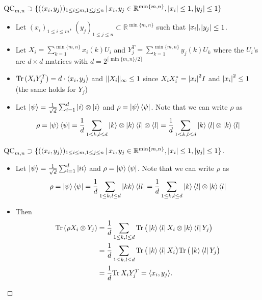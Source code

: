 \begin{frame}
	\begin{block}{$ \textup{QC}_{m,n} \supset \{ (\langle x_i,y_j \rangle)_{1 \le i \le m, 1 \le j \le n} \,| \, x_i,y_j \in \mathbb{R}^{ \min \{m,n \} }, \vert x_i  \vert \le 1, \vert y_j \vert \le 1  \} $}
		\begin{itemize}
			\item<1->  Let $ (x_i)_{1 \le i \le m}, \, (y_j)_{1 \le j \le n} \subset \mathbb{R}^{\min \{ m,n \}}$ such that $ {\left|{x_i}\right|},$$ {\left|{y_j}\right|} \le 1 $. 
			\item<2->  Let $ X_i = \sum_{k=1}^{\min \{m,n\}} x_i(k)U_i $ and $ Y_j^{T } = \sum_{k=1}^{\min \{m,n\}}y_j(k)U_k $ where the $ U_i $'s are $ d \times d $ matrices with $  d = 2^{\lceil \min \{m,n\}/2 \rceil} $
			\item<3-> $ \textup{Tr} \, {(X_iY_j^T)}  = d\cdot \langle x_i, y_j \rangle  $ and $  \Vert {X_i} \Vert_{\infty} \le 1 $ since $ X_iX_i^* = {\left|{x_i}\right|}^2I $ and $ {\left|{x_i}\right|}^2 \le 1  $ (the same holds for $ Y_j $)
			\item<4-> Let $ \ket{\psi} = \frac{1}{\sqrt{d}}\sum_{i= 1}^{d}\ket{i}\otimes \ket{i} $ and $ \rho = \ket{\psi}\bra{\psi} $. Note that we can write $ \rho $ as
			\begin{align*}
			\rho = \ket{\psi}\bra{\psi} = \frac{1}{d}\sum_{1 \le k,l \le d}\ket{k}\otimes \ket{k}\bra{l}\otimes \bra{l} =  \frac{1}{d} \sum_{1 \le k,l \le d}\ket{k}\bra{l} \otimes \ket{k}\bra{l}
			\end{align*}
		\end{itemize}
	\end{block}
\end{frame}

\begin{frame}
	\begin{proof}[$ \textup{QC}_{m,n} \supset \{ (\langle x_i,y_j \rangle)_{1 \le i \le m, 1 \le j \le n} \,| \, x_i,y_j \in \mathbb{R}^{ \min \{m,n \} }, \vert x_i  \vert \le 1, \vert y_j \vert \le 1  \} $]
		\begin{itemize}
			\item<1->{\footnotesize Let $ \ket{\psi} = \frac{1}{\sqrt{d}}\sum_{i= 1}^{d}\ket{ii} $ and $ \rho = \ket{\psi}\bra{\psi} $. Note that we can write $ \rho $ as
			\begin{align*}
			\rho = \ket{\psi}\bra{\psi} = \frac{1}{d}\sum_{1 \le k,l \le d}\ket{kk}\bra{ll} = \frac{1}{d} \sum_{1 \le k,l \le d}\ket{k}\bra{l} \otimes \ket{k}\bra{l}
			\end{align*}}
			\item<1-> Then 
			\begin{align*}
			\textup{Tr} \, {(\rho X_i \otimes Y_j)}  &=\frac{1}{d} \sum_{1 \le k,l \le d} \textup{Tr} \, { \big (\ket{k}\bra{l}X_i \otimes \ket{k}\bra{l}Y_j \big )}    \\
			&= \frac{1}{d} \sum_{1 \le k,l \le d} \textup{Tr} \, {\big (\ket{k}\bra{l}X_i \big )}  \textup{Tr} \, {\big (\ket{k}\bra{l}Y_j \big )}  \\
			&=  \frac{1}{d} \textup{Tr} \, {X_iY_j^T}  = \langle x_i,y_j \rangle.
			\end{align*}
		\end{itemize}
	\end{proof}
\end{frame}


